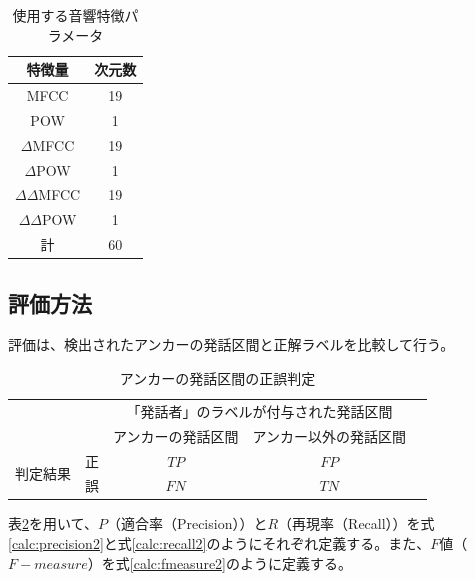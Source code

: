\begin{table}[H]
  \begin{center}
    \caption{使用する音響特徴パラメータ \label{iv_feature2}}
    \begin{tabular}{|c||c|} \hline
      特徴量 & 次元数\\ \hline
      MFCC & 19  \\ 
      POW & 1  \\ 
      $\Delta$MFCC & 19 \\ 
      $\Delta$POW & 1 \\ 
      $\Delta\Delta$MFCC & 19 \\ 
      $\Delta\Delta$POW & 1 \\ \hline
      計 & 60 \\ \hline
    \end{tabular}
  \end{center}
\end{table}

\subsection{評価方法}
評価は、検出されたアンカーの発話区間と正解ラベルを比較して行う。

\begin{table}[H]
\begin{center}
    \caption{アンカーの発話区間の正誤判定 \label{table:clustering}}
\begin{tabular}{|c|c|c|c|l}
\cline{1-4}
\multicolumn{2}{|c|}{\multirow{2}{*}{}} & \multicolumn{2}{c|}{「発話者」のラベルが付与された発話区間} &  \\ \cline{3-4}
\multicolumn{2}{|c|}{}                  & アンカーの発話区間        & アンカー以外の発話区間        &  \\ \cline{1-4}
\multirow{2}{*}{判定結果}        & 正        & $TP$                  & $FP$                   &  \\ \cline{2-4}
& 誤        & $FN$                  & $TN$                   &  \\ \cline{1-4}
\end{tabular}
\end{center}
\end{table}

表\ref{table:clustering}を用いて、$P$（適合率（Precision））と$R$（再現率（Recall））を式\ref{calc:precision2}と式\ref{calc:recall2}のようにそれぞれ定義する。また、$F$値（$F-measure$）を式\ref{calc:fmeasure2}のように定義する。

